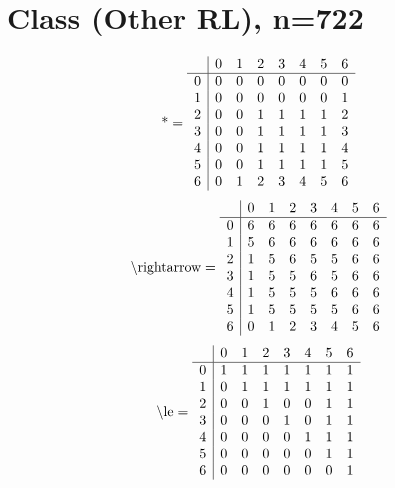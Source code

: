 \documentclass[11pt]{article}
\begin{document}
\section{Class (Other RL), n=722}
\[\text{*} = 
\begin{array}{r | r r r r r r r}
 & 0 & 1 & 2 & 3 & 4 & 5 & 6 \\ \hline
0 & 0 & 0 & 0 & 0 & 0 & 0 & 0 \\
1 & 0 & 0 & 0 & 0 & 0 & 0 & 1 \\
2 & 0 & 0 & 1 & 1 & 1 & 1 & 2 \\
3 & 0 & 0 & 1 & 1 & 1 & 1 & 3 \\
4 & 0 & 0 & 1 & 1 & 1 & 1 & 4 \\
5 & 0 & 0 & 1 & 1 & 1 & 1 & 5 \\
6 & 0 & 1 & 2 & 3 & 4 & 5 & 6 \\
\end{array}
\]
\[\text{\textbackslash rightarrow} = 
\begin{array}{r | r r r r r r r}
 & 0 & 1 & 2 & 3 & 4 & 5 & 6 \\ \hline
0 & 6 & 6 & 6 & 6 & 6 & 6 & 6 \\
1 & 5 & 6 & 6 & 6 & 6 & 6 & 6 \\
2 & 1 & 5 & 6 & 5 & 5 & 6 & 6 \\
3 & 1 & 5 & 5 & 6 & 5 & 6 & 6 \\
4 & 1 & 5 & 5 & 5 & 6 & 6 & 6 \\
5 & 1 & 5 & 5 & 5 & 5 & 6 & 6 \\
6 & 0 & 1 & 2 & 3 & 4 & 5 & 6 \\
\end{array}
\]
\[\text{\textbackslash le} = 
\begin{array}{r | r r r r r r r}
 & 0 & 1 & 2 & 3 & 4 & 5 & 6 \\ \hline
0 & 1 & 1 & 1 & 1 & 1 & 1 & 1 \\
1 & 0 & 1 & 1 & 1 & 1 & 1 & 1 \\
2 & 0 & 0 & 1 & 0 & 0 & 1 & 1 \\
3 & 0 & 0 & 0 & 1 & 0 & 1 & 1 \\
4 & 0 & 0 & 0 & 0 & 1 & 1 & 1 \\
5 & 0 & 0 & 0 & 0 & 0 & 1 & 1 \\
6 & 0 & 0 & 0 & 0 & 0 & 0 & 1 \\
\end{array}
\]
\end{document}
